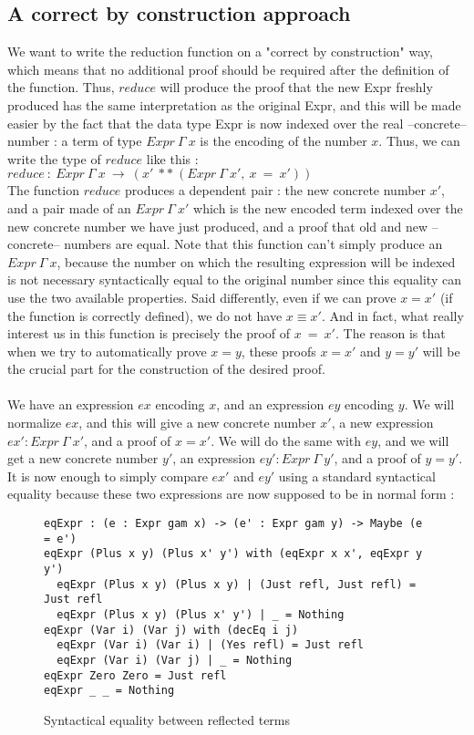 \subsection{A correct by construction approach}

We want to write the reduction function on a "correct by construction" way, which means that no additional proof should be required after the definition of the function. Thus, $reduce$ will produce the proof that the new Expr freshly produced has the same interpretation as the original Expr, and this will be made easier by the fact that the data type Expr is now indexed over the real --concrete-- number : a term of type $Expr\ \Gamma\ x$ is the encoding of the number $x$.
Thus, we can write the type of $reduce$ like this : \\
$reduce\ :\ Expr\ \Gamma\ x\ \rightarrow\ (x'\ **\ (Expr\ \Gamma\ x',\ x\ =\ x'))$ \\
The function $reduce$ produces a dependent pair : the new concrete number $x'$, and a pair made of an $Expr\ \Gamma\ x'$ which is the new encoded term indexed over the new concrete number we have just produced, and a proof that old and new --concrete-- numbers are equal.
Note that this function can't simply produce an $Expr\ \Gamma\ x$, because the number on which the resulting expression will be indexed is not necessary syntactically equal to the original number since this equality can use the two available properties. Said differently, even if we can prove $x=x'$ (if the function is correctly defined), we do not have $x \equiv x'$.
And in fact, what really interest us in this function is precisely the proof of $x\ =\ x'$.
The reason is that when we try to automatically prove $x=y$, these proofs $x=x'$ and $y=y'$ will be the crucial part for the construction of the desired proof. \\
\\
We have an expression $ex$ encoding $x$, and an expression $ey$ encoding $y$. We will normalize $ex$, and this will give a new concrete number $x'$, a new expression $ex':Expr\ \Gamma\ x'$, and a proof of $x=x'$. We will do the same with $ey$, and we will get a new concrete number $y'$, an expression $ey':Expr\ \Gamma\ y'$, and a proof of $y=y'$. \\
It is now enough to simply compare $ex'$ and $ey'$ using a standard syntactical equality because these two expressions are now supposed to be in normal form :

\begin{figure}[H]
\figrule
\begin{center}
\begin{verbatim}
eqExpr : (e : Expr gam x) -> (e' : Expr gam y) -> Maybe (e = e')
eqExpr (Plus x y) (Plus x' y') with (eqExpr x x', eqExpr y y')
  eqExpr (Plus x y) (Plus x y) | (Just refl, Just refl) = Just refl
  eqExpr (Plus x y) (Plus x' y') | _ = Nothing
eqExpr (Var i) (Var j) with (decEq i j)
  eqExpr (Var i) (Var i) | (Yes refl) = Just refl
  eqExpr (Var i) (Var j) | _ = Nothing
eqExpr Zero Zero = Just refl
eqExpr _ _ = Nothing
\end{verbatim}
\end{center}
\caption{Syntactical equality between reflected terms}
\figrule
\end{figure}


